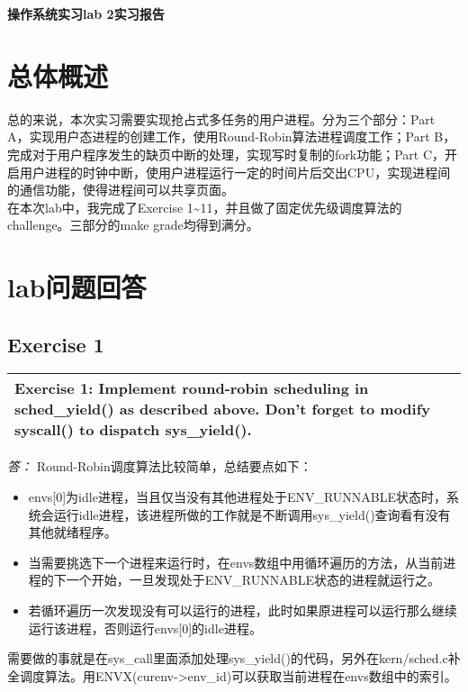 \documentclass[11pt,a4paper]{article}
\newcommand{\exercise}[2]{
\begin{tabular}{|p{\textwidth}|}
\hline
#1: #2\\
\hline
\end{tabular}
\textit{\large{答：}}}
\begin{document}

\centerline{\Huge{\textbf{操作系统实习lab 2实习报告}}}
\tableofcontents
\thispagestyle{empty}

\section{总体概述}
总的来说，本次实习需要实现抢占式多任务的用户进程。分为三个部分：Part A，实现用户态进程的创建工作，使用Round-Robin算法进程调度工作；Part B，完成对于用户程序发生的缺页中断的处理，实现写时复制的fork功能；Part C，开启用户进程的时钟中断，使用户进程运行一定的时间片后交出CPU，实现进程间的通信功能，使得进程间可以共享页面。\\
在本次lab中，我完成了Exercise 1\~{}11，并且做了固定优先级调度算法的challenge。三部分的make grade均得到满分。

\section{lab问题回答}
\subsection{Exercise 1}
\exercise{Exercise 1}{Implement round-robin scheduling in sched\_yield() as described above. Don't forget to modify syscall() to dispatch sys\_yield().}
Round-Robin调度算法比较简单，总结要点如下：\\
\begin{itemize} 
\item envs[0]为idle进程，当且仅当没有其他进程处于ENV\_RUNNABLE状态时，系统会运行idle进程，该进程所做的工作就是不断调用sys\_yield()查询看有没有其他就绪程序。
\item 当需要挑选下一个进程来运行时，在envs数组中用循环遍历的方法，从当前进程的下一个开始，一旦发现处于ENV\_RUNNABLE状态的进程就运行之。
\item 若循环遍历一次发现没有可以运行的进程，此时如果原进程可以运行那么继续运行该进程，否则运行envs[0]的idle进程。
\end{itemize}
需要做的事就是在sys\_call里面添加处理sys\_yield()的代码，另外在kern/sched.c补全调度算法。用ENVX(curenv->env\_id)可以获取当前进程在envs数组中的索引。
\\
\end{document}
